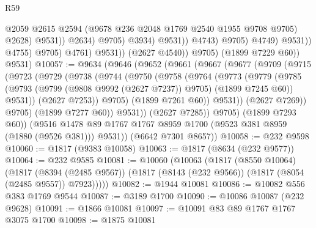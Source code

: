 \begin{lexlean}{R59}
\begin{coremodule}
                                                @2059
                                                @2615
                                                @2594
                                                (@9678 @236 @2048 @1769 @2540 @1955 @9708 @9705)
                                                @2628)
                                              @9531))
                                          @2634)
                                        @9705)
                                      @3934)
                                    @9531))
                                @4743)
                              @9705)
                            @4749)
                          @9531))
                      @4755)
                    @9705)
                  @4761)
                @9531))
            (@2627 @4540))
          @9705)
        (@1899 @7229 @60))
      @9531)
@10057 := @9634
    (@9646
      (@9652
        (@9661
          (@9667
            (@9677
              (@9709
                (@9715
                  (@9723
                    (@9729
                      (@9738
                        (@9744
                          (@9750
                            (@9758
                              (@9764
                                (@9773
                                  (@9779
                                    (@9785
                                      (@9793
                                        (@9799 (@9808 @9992 (@2627 @7237)) @9705)
                                        (@1899 @7245 @60))
                                      @9531))
                                  (@2627 @7253))
                                @9705)
                              (@1899 @7261 @60))
                            @9531))
                        (@2627 @7269))
                      @9705)
                    (@1899 @7277 @60))
                  @9531))
              (@2627 @7285))
            @9705)
          (@1899 @7293 @60))
        (@9516 @1478 @89 @1767 @1767 @8959 @1700 (@9523 @381 @8959 (@1880 (@9526 @381))) @9531))
      (@6642 @7301 @8657))
@10058 := @232 @9598
@10060 := @1817 (@9383 @10058)
@10063 := @1817 (@8634 (@232 @9577))
@10064 := @232 @9585
@10081 := @10060
    (@10063
      (@1817
        (@8550 @10064)
        (@1817
          (@8394 (@2485 @9567))
          (@1817 (@8143 (@232 @9566)) (@1817 (@8054 (@2485 @9557)) @7923)))))
@10082 := @1944 @10081
@10086 := @10082 @556 @383 @1769 @9544
@10087 := @3189 @1700
@10090 := @10086 @10087 (@232 @9628)
@10091 := @1866 @10081
@10097 := @10091 @83 @89 @1767 @1767 @3075 @1700
@10098 := @1875 @10081

\end{coremodule}
\end{lexlean}

